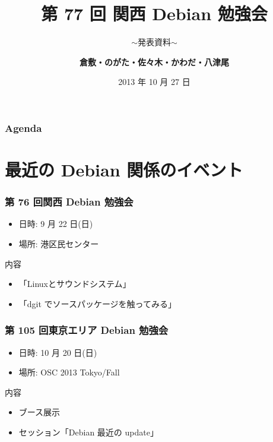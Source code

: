 \documentclass[cjk,dvipdfmx,10pt,compress,%
hyperref={bookmarks=true,bookmarksnumbered=true,bookmarksopen=false,%
colorlinks=false,%
pdftitle={第 77 回 関西 Debian 勉強会},%
pdfauthor={倉敷・のがた・佐々木・かわだ・八津尾},%
pdfsubject={資料},%
}]{beamer}
\title{第 77 回 関西 Debian 勉強会}
\subtitle{$\sim$発表資料$\sim$}
\author[かわだ てつたろう]{{\large\bf 倉敷・のがた・佐々木・かわだ・八津尾}}
\institute[Debian JP]{{\normalsize\tt 関西 Debian 勉強会}}
\date{{\small 2013 年 10 月 27 日}}
\begin{document}
\settitleslide
\begin{frame}
\titlepage
\end{frame}
\setdefaultslide

\begin{frame}[fragile]
\frametitle{Agenda}

\tableofcontents

\end{frame}

\section{最近の Debian 関係のイベント}


\begin{frame}[fragile]
  \frametitle{第 76 回関西 Debian 勉強会}
  \begin{itemize}
  \item 日時: 9 月 22 日(日)
  \item 場所: 港区民センター
  \end{itemize}
  \begin{block}{内容}
    \begin{itemize}
    \item 「Linuxとサウンドシステム」
    \item 「dgit でソースパッケージを触ってみる」
    \end{itemize}
  \end{block}
\end{frame}

\begin{frame}[fragile]
  \frametitle{第 105 回東京エリア Debian 勉強会}
  \begin{itemize}
  \item 日時: 10 月 20 日(日)
  \item 場所: OSC 2013 Tokyo/Fall
  \end{itemize}
  \begin{block}{内容}
    \begin{itemize}
    \item ブース展示
    \item セッション「Debian 最近の update」
    \end{itemize}
  \end{block}
\end{frame}
\end{document}
